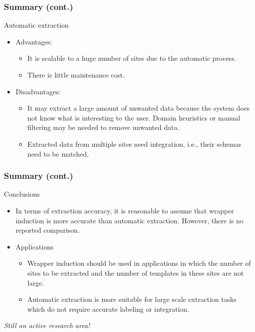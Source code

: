 \documentclass[svgnames]{beamer}
\begin{document}

\begin{frame} \frametitle{Summary (cont.)}

  Automatic extraction
  \begin{itemize}
  \item Advantages:
    \begin{itemize}
    \item It is scalable to a huge number of sites due to the automatic
      process.
    \item There is little maintenance cost.
    \end{itemize}
  \item Disadvantages:
    \begin{itemize}
    \item It may extract a large amount of unwanted data because the system
      does not know what is interesting to the user. Domain heuristics or
      manual filtering may be needed to remove unwanted data.
    \item Extracted data from multiple sites need integration, i.e., their
      schemas need to be matched.
    \end{itemize}
  \end{itemize}

\end{frame}


\begin{frame} \frametitle{Summary (cont.)}

  Conclusions
  \begin{itemize}
  \item In terms of extraction accuracy, it is reasonable to assume that
    wrapper induction is more accurate than automatic extraction. However,
    there is no reported comparison.
  \item Applications
    \begin{itemize}
    \item Wrapper induction should be used in applications in which the number
      of sites to be extracted and the number of templates in these sites are
      not large.
    \item Automatic extraction is more suitable for large scale extraction
      tasks which do not require accurate labeling or integration.
    \end{itemize}
  \end{itemize}

  \begin{center}
      \emph{Still an active research area!}
  \end{center}

\end{frame}
\end{document}
